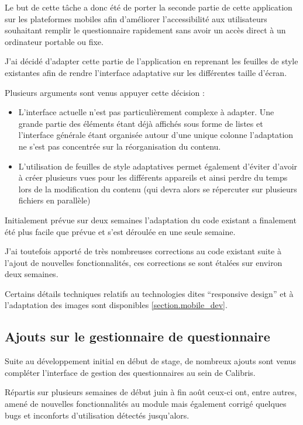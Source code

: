\documentclass[12pt,a4paper]{book}
\begin{document}
Le but de cette tâche a donc été de porter la seconde partie de cette application sur les plateformes mobiles afin d'améliorer l'accessibilité aux utilisateurs souhaitant remplir le questionnaire rapidement sans avoir un accès direct à un ordinateur portable ou fixe.

J'ai décidé d'adapter cette partie de l'application en reprenant les feuilles de style existantes afin de rendre l'interface adaptative sur les différentes taille d'écran.

Plusieurs arguments sont venus appuyer cette décision :
\begin{itemize}
  \item L'interface actuelle n'est pas particulièrement complexe à adapter. Une grande partie des éléments étant déjà affichés sous forme de listes et l'interface générale étant organisée autour d'une unique colonne l'adaptation ne s'est pas concentrée sur la réorganisation du contenu.
  \item L'utilisation de feuilles de style adaptatives permet également d'éviter d'avoir à créer plusieurs vues pour les différents appareils et ainsi perdre du temps lors de la modification du contenu (qui devra alors se répercuter sur plusieurs fichiers en parallèle)
\end{itemize}

Initialement prévue sur deux semaines l'adaptation du code existant a finalement été plus facile que prévue et s'est déroulée en une seule semaine.

J'ai toutefois apporté de très nombreuses corrections au code existant suite à l'ajout de nouvelles fonctionnalités, ces corrections se sont étalées sur environ deux semaines.

Certains détails techniques relatifs au technologies dites ``responsive design'' et à l'adaptation des images sont disponibles \cref{section.mobile_dev}.

\subsection{Ajouts sur le gestionnaire de questionnaire}

Suite au développement initial en début de stage, de nombreux ajouts sont venus compléter l'interface de gestion des questionnaires au sein de Calibris.

Répartis sur plusieurs semaines de début juin à fin août ceux-ci ont, entre autres, amené de nouvelles fonctionnalités au module mais également corrigé quelques bugs et inconforts d'utilisation détectés jusqu'alors.
\end{document}

